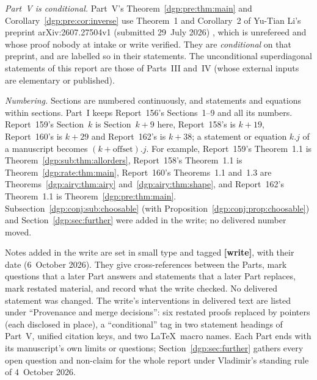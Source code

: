 \documentclass[11pt,letterpaper]{article}
\numberwithin{equation}{section}
\theoremstyle{remark}\newtheorem{remark}[theorem]{Remark}
\begin{document}
\emph{Part~V is conditional.} Part~V's Theorem~\ref{dgp:pre:thm:main} and Corollary~\ref{dgp:pre:cor:inverse} use Theorem~1 and Corollary~2 of Yu-Tian Li's preprint arXiv:2607.27504v1 (submitted 29~July 2026) \cite{li}, which is unrefereed and whose proof nobody at intake or write verified. They are \emph{conditional} on that preprint, and are labelled so in their statements. The unconditional superdiagonal statements of this report are those of Parts~III and~IV (whose external inputs are elementary or published).

\emph{Numbering.} Sections are numbered continuously, and statements and equations within sections. Part~I keeps Report~156's Sections~1--9 and all its numbers. Report~159's Section~$k$ is Section~$k+9$ here, Report~158's is $k+19$, Report~160's is $k+29$ and Report~162's is $k+38$; a statement or equation $k.j$ of a manuscript becomes $(k+\text{offset}).j$. For example, Report~159's Theorem~1.1 is Theorem~\ref{dgp:sub:thm:allorders}, Report~158's Theorem~1.1 is Theorem~\ref{dgp:rate:thm:main}, Report~160's Theorems~1.1 and~1.3 are Theorems~\ref{dgp:airy:thm:airy} and~\ref{dgp:airy:thm:shape}, and Report~162's Theorem~1.1 is Theorem~\ref{dgp:pre:thm:main}. Subsection~\ref{dgp:conj:sub:choosable} (with Proposition~\ref{dgp:conj:prop:choosable}) and Section~\ref{dgp:sec:further} were added in the write; no delivered number moved.

Notes added in the write are set in small type and tagged \textbf{[write]}, with their date (6~October 2026). They give cross-references between the Parts, mark questions that a later Part answers and statements that a later Part replaces, mark restated material, and record what the write checked. No delivered statement was changed. The write's interventions in delivered text are listed under ``Provenance and merge decisions'': six restated proofs replaced by pointers (each disclosed in place), a ``conditional'' tag in two statement headings of Part~V, unified citation keys, and two \LaTeX\ macro names. Each Part ends with its manuscript's own limits or questions; Section~\ref{dgp:sec:further} gathers every open question and non-claim for the whole report under Vladimir's standing rule of 4~October 2026.
\end{document}
